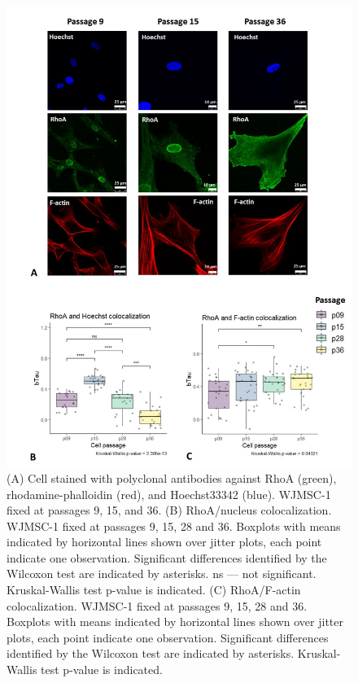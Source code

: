 \documentclass[alpha-refs]{wiley-article}
\begin{document}
\begin{figure}[hbt!]
  \includegraphics[width=0.9\linewidth]{rho.jpg}
  \caption{(A) Cell stained with polyclonal antibodies against RhoA (green), rhodamine-phalloidin (red), and Hoechst33342 (blue). WJMSC-1 fixed at passages 9, 15, and 36. (B) RhoA/nucleus colocalization. WJMSC-1 fixed at passages 9, 15, 28 and 36. Boxplots with means indicated by horizontal lines shown over jitter plots, each point indicate one observation. Significant differences identified by the Wilcoxon test are indicated by asterisks. ns --- not significant. Kruskal-Wallis test p-value is indicated. (C) RhoA/F-actin colocalization. WJMSC-1 fixed at passages 9, 15, 28 and 36. Boxplots with means indicated by horizontal lines shown over jitter plots, each point indicate one observation. Significant differences identified by the Wilcoxon test are indicated by asterisks. Kruskal-Wallis test p-value is indicated.}
  \centering
\end{figure}
\end{document}

